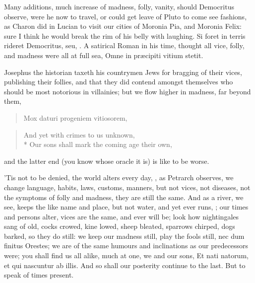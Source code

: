 {Many additions, much increase of madness, folly, vanity, should
Democritus observe, were he now to travel, or could get leave of Pluto
to come see fashions, as Charon did in Lucian to visit our cities of
Moronia Pia, and Moronia Felix: sure I think he would break the rim of
his belly with laughing. Si foret in terris rideret Democritus,
seu, \etc{}. A satirical Roman in his time, thought all vice, folly, and
madness were all at full sea, Omne in pr\ae{}cipiti vitium stetit.

Josephus the historian taxeth his countrymen Jews for bragging of
their vices, publishing their follies, and that they did contend
amongst themselves who should be most notorious in villainies; but we
flow higher in madness, far beyond them,
\begin{verse}
\textlatin{Mox daturi progeniem vitiosorem,}
\end{verse}

\begin{verse}
And yet with crimes to us unknown,\\*
Our sons shall mark the coming age their own,
\end{verse}

and the latter end (you know whose oracle it is) is like to be worse.

'Tis not to be denied, the world alters every day, , as
Petrarch observes, we change language, habits, laws, customs,
manners, but not vices, not diseases, not the symptoms of folly and
madness, they are still the same. And as a river, we see, keeps the
like name and place, but not water, and yet ever runs, ; our times and persons alter, vices are
the same, and ever will be; look how nightingales sang of old, cocks
crowed, kine lowed, sheep bleated, sparrows chirped, dogs barked, so
they do still: we keep our madness still, play the fools still, nec dum
finitus Orestes; we are of the same humours and inclinations as our
predecessors were; you shall find us all alike, much at one, we and our
sons, Et nati natorum, et qui nascuntur ab illis. And so shall our
posterity continue to the last. But to speak of times present.

}
